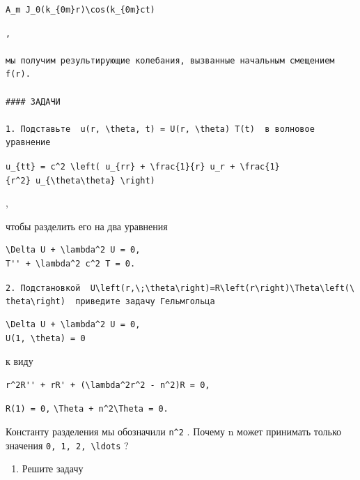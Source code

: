 \documentclass[
  ukrainian,
]{article}
\providecommand{\tightlist}{%
  \setlength{\itemsep}{0pt}\setlength{\parskip}{0pt}}
\begin{document}
\begin{verbatim}
A_m J_0(k_{0m}r)\cos(k_{0m}ct)
\end{verbatim}

\begin{verbatim}
,

мы получим результирующие колебания, вызванные начальным смещением f(r).

#### ЗАДАЧИ

1. Подставьте  u(r, \theta, t) = U(r, \theta) T(t)  в волновое уравнение
\end{verbatim}

\texttt{u\_\{tt\}\ =\ c\^{}2\ \textbackslash{}left(\ u\_\{rr\}\ +\ \textbackslash{}frac\{1\}\{r\}\ u\_r\ +\ \textbackslash{}frac\{1\}\{r\^{}2\}\ u\_\{\textbackslash{}theta\textbackslash{}theta\}\ \textbackslash{}right)}

,

чтобы разделить его на два уравнения

\begin{verbatim}
\Delta U + \lambda^2 U = 0,
T'' + \lambda^2 c^2 T = 0.
\end{verbatim}

\texttt{2.\ Подстановкой\ \ \textquotesingle{}U\textbackslash{}left(r,\textbackslash{};\textbackslash{}theta\textbackslash{}right)=R\textbackslash{}left(r\textbackslash{}right)\textbackslash{}Theta\textbackslash{}left(\textbackslash{}theta\textbackslash{}right)\textquotesingle{}\ \ приведите\ задачу\ Гельмгольца}

\begin{verbatim}
\Delta U + \lambda^2 U = 0,
U(1, \theta) = 0
\end{verbatim}

к виду

\begin{verbatim}
r^2R'' + rR' + (\lambda^2r^2 - n^2)R = 0,
\end{verbatim}

\texttt{R(1)\ =\ 0,}
\texttt{\textbackslash{}Theta\textquotesingle{}\textquotesingle{}\ +\ n\^{}2\textbackslash{}Theta\ =\ 0.}

Константу разделения мы обозначили \texttt{n\^{}2} . Почему n может
принимать только значения \texttt{0,\ 1,\ 2,\ \textbackslash{}ldots} ?

\begin{enumerate}
\def\labelenumi{\arabic{enumi}.}
\setcounter{enumi}{2}
\tightlist
\item
  Решите задачу
\end{enumerate}
\end{document}
